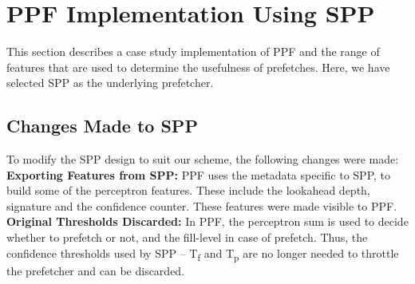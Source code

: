 \section{PPF Implementation Using SPP}
\label{Impl}

This section describes a case study implementation of PPF and the
range of features that are used to determine the usefulness of
prefetches.  Here, we have selected SPP as the underlying prefetcher.

\subsection{Changes Made to SPP}
\label{Impl-Changes}
\noindent To modify the SPP design to suit our scheme, the following changes
were made:
\newline
\newline
\noindent \textbf{Exporting Features from SPP:} PPF uses the metadata 
specific to SPP, to build some of the perceptron features. These include
the lookahead depth, signature and the confidence counter. These features 
were made visible to PPF.
%
\newline
\newline
\noindent \textbf{Original Thresholds Discarded:} In PPF, the
perceptron sum is used to decide whether to prefetch or not, and the
fill-level in case of prefetch.  Thus, the confidence thresholds used 
by SPP -- T\textsubscript{f} and T\textsubscript{p} are no longer needed to
throttle the prefetcher and can be discarded.

